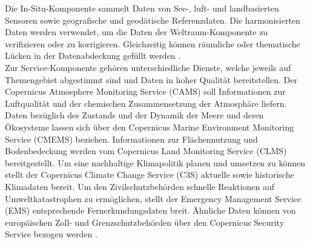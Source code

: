 Die In-Situ-Komponente sammelt Daten von See-, luft- und landbasierten Sensoren sowie geografische und geodätische Referenzdaten. Die harmonisierten Daten 
werden verwendet, um die Daten der Weltraum-Komponente zu verifizieren oder zu korrigieren. Gleichzeitig können räumliche oder thematische Lücken in der 
Datenabdeckung gefüllt werden \cite{copernicus_regulation}\cite{what_is_copernicus}. \\

Zur Service-Komponente gehören unterschiedliche Dienste, welche jeweils auf Themengebiet abgestimmt sind und Daten in hoher Qualität bereitstellen.
Der Copernicus Atmosphere Monitoring Service (CAMS) soll Informationen zur Luftqualität und der chemischen Zusammensetzung der Atmosphäre liefern. 
Daten bezüglich des Zustands und der Dynamik der Meere und deren Ökosysteme lassen sich über den Copernicus Marine Environment Monitoring Service (CMEMS) beziehen. 
Informationen zur Flächennutzung und Bodenbedeckung werden vom Copernicus Land Monitoring Service (CLMS) bereitgestellt. 
Um eine nachhaltige Klimapolitik planen und umsetzen zu können stellt der Copernicus Climate Change Service (C3S) aktuelle sowie historische Klimadaten bereit.  
Um den Zivilschutzbehörden schnelle Reaktionen auf Umweltkatastrophen zu ermöglichen, stellt der Emergency Management Service (EMS) entsprechende Fernerkundungsdaten 
breit. Ähnliche Daten können von europäischen Zoll- und Grenzschutzbehörden über den Copernicus Security Service bezogen werden
\cite{copernicus_regulation}\cite{what_is_copernicus}.


